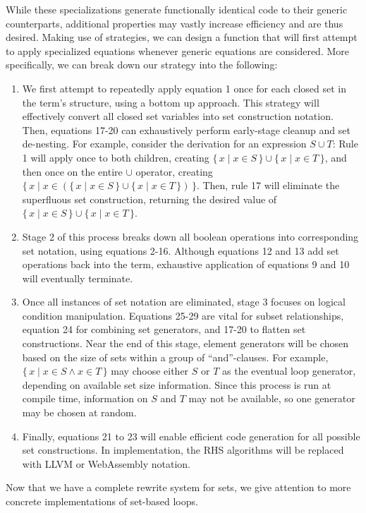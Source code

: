 \documentclass{article}
\newcommand{\Set}[2]{%
  \{\, #1 \mid #2 \, \}%
}
\begin{document}
While these specializations generate functionally identical code to their generic counterparts, additional properties may vastly increase efficiency and are thus desired. Making use of strategies, we can design a function that will first attempt to apply specialized equations whenever generic equations are considered. More specifically, we can break down our strategy into the following:
\begin{enumerate}
  \item We first attempt to repeatedly apply equation 1 once for each closed set in the term's structure, using a bottom up approach. This strategy will effectively convert all closed set variables into set construction notation. Then, equations 17-20 can exhaustively perform early-stage cleanup and set de-nesting. For example, consider the derivation for an expression $S \cup T$: Rule 1 will apply once to both children, creating $\Set{x}{x \in S} \cup \Set{x}{x \in T}$, and then once on the entire $\cup$ operator, creating $\Set{x}{x \in (\Set{x}{x \in S} \cup \Set{x}{x \in T})}$. Then, rule 17 will eliminate the superfluous set construction, returning the desired value of $\Set{x}{x \in S} \cup \Set{x}{x \in T}$.
  \item Stage 2 of this process breaks down all boolean operations into corresponding set notation, using equations 2-16. Although equations 12 and 13 add set operations back into the term, exhaustive application of equations 9 and 10 will eventually terminate.
  \item Once all instances of set notation are eliminated, stage 3 focuses on logical condition manipulation. Equations 25-29 are vital for subset relationships, equation 24 for combining set generators, and 17-20 to flatten set constructions. Near the end of this stage, element generators will be chosen based on the size of sets within a group of ``and''-clauses. For example, $\Set{x}{x \in S \land x \in T}$ may choose either $S$ or $T$ as the eventual loop generator, depending on available set size information. Since this process is run at compile time, information on $S$ and $T$ may not be available, so one generator may be chosen at random.
  \item Finally, equations 21 to 23 will enable efficient code generation for all possible set constructions. In implementation, the RHS algorithms will be replaced with LLVM or WebAssembly notation.
\end{enumerate}

Now that we have a complete rewrite system for sets, we give attention to more concrete implementations of set-based loops.
\end{document}
